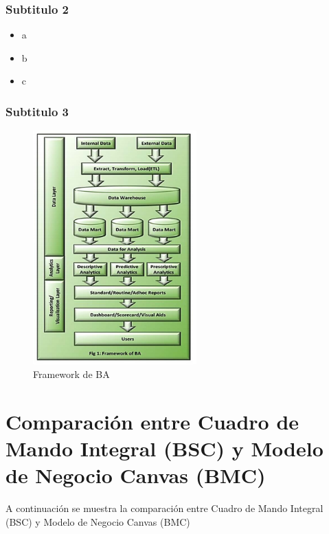 \documentclass[preprint,12pt]{elsarticle}
\begin{document}
	\subsubsection{\textbf{Subtitulo 2}}

	\begin{itemize}
	\item a
	\item b
	\item c
	\end{itemize}

	\subsubsection{\textbf{Subtitulo 3}}

	\begin{figure}[htb]
		\begin{center}
			\includegraphics[height=9cm]{./IMAGENES/BAFramework} 
			\caption{Framework de BA}
		\end{center}
	\end{figure}





\section{Comparación entre Cuadro de Mando Integral (BSC) y Modelo de Negocio Canvas (BMC)}
A continuación se muestra la comparación entre Cuadro de Mando Integral (BSC) y Modelo de Negocio Canvas (BMC)
	
\end{document}

